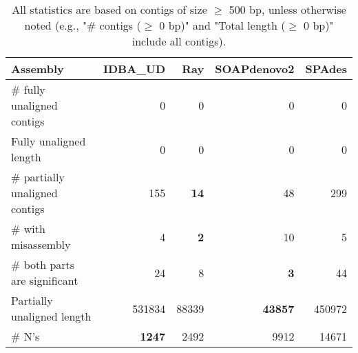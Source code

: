 \documentclass[12pt,a4paper]{article}
\begin{document}
\begin{table}[ht]
\begin{center}
\caption{All statistics are based on contigs of size $\geq$ 500 bp, unless otherwise noted (e.g., "\# contigs ($\geq$ 0 bp)" and "Total length ($\geq$ 0 bp)" include all contigs).}
\begin{tabular}{|l*{4}{|r}|}
\hline
Assembly & IDBA\_UD & Ray & SOAPdenovo2 & SPAdes \\ \hline
\# fully unaligned contigs & 0 & 0 & 0 & 0 \\ \hline
Fully unaligned length & 0 & 0 & 0 & 0 \\ \hline
\# partially unaligned contigs & 155 & {\bf 14} & 48 & 299 \\ \hline
\hspace{5mm}\# with misassembly & 4 & {\bf 2} & 10 & 5 \\ \hline
\hspace{5mm}\# both parts are significant & 24 & 8 & {\bf 3} & 44 \\ \hline
Partially unaligned length & 531834 & 88339 & {\bf 43857} & 450972 \\ \hline
\# N's & {\bf 1247} & 2492 & 9912 & 14671 \\ \hline
\end{tabular}
\end{center}
\end{table}
\end{document}
